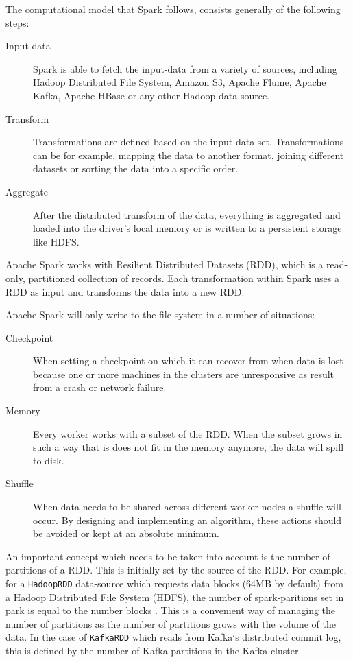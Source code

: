 The computational model that Spark follows, consists generally of the following steps:

\begin{description}
  \item[Input-data] Spark is able to fetch the input-data from a variety of sources, including Hadoop Distributed File System, Amazon S3, Apache Flume, Apache Kafka, Apache HBase or any other Hadoop data source.
  \item[Transform] Transformations are defined based on the input data-set. Transformations can be for example, mapping the data to another format, joining different datasets or sorting the data into a specific order.
  \item[Aggregate] After the distributed transform of the data, everything is aggregated and loaded into the driver's local memory or is written to a persistent storage like HDFS.
\end{description}

Apache Spark works with Resilient Distributed Datasets (RDD), which is a read-only, partitioned collection of records. Each transformation within Spark uses a RDD as input and transforms the data into a new RDD. 

Apache Spark will only write to the file-system in a number of situations:
\begin{description}
    \item[Checkpoint] When setting a checkpoint on which it can recover from when data is lost because one or more machines in the clusters are unresponsive as result from a crash or network failure.
    \item[Memory] Every worker works with a subset of the RDD. When the subset grows in such a way that is does not fit in the memory anymore, the data will spill to disk.
    \item[Shuffle] When data needs to be shared across different worker-nodes a shuffle will occur. By designing and implementing an algorithm, these actions should be avoided or kept at an absolute minimum.
\end{description}

An important concept which needs to be taken into account is the number of partitions of a RDD. This is initially set by the source of the RDD. For example, for a \texttt{HadoopRDD} data-source which requests data blocks (64MB by default) from a Hadoop Distributed File System (HDFS), the number of spark-paritions set in park is equal to the number blocks \cite{Dean:2008:MSD:1327452.1327492}. This is a convenient way of managing the number of partitions as the number of partitions grows with the volume of the data. In the case of \texttt{KafkaRDD} which reads from Kafka`s distributed commit log, this is defined by the number of Kafka-partitions in the Kafka-cluster.

